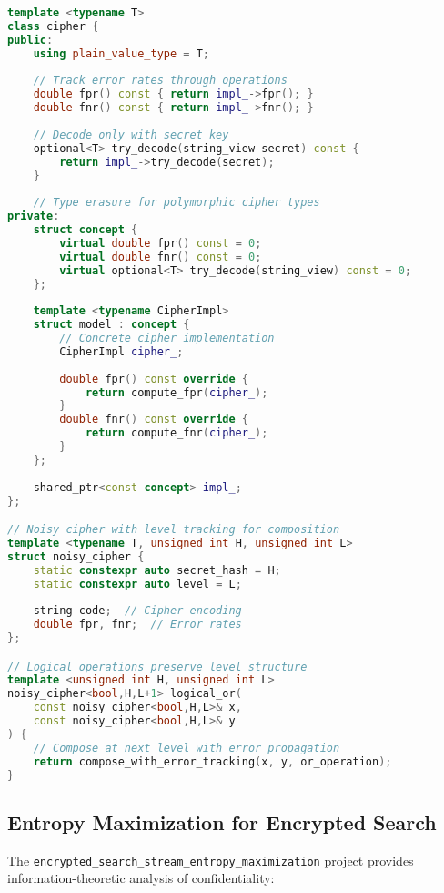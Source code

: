 \begin{lstlisting}[language=C++, caption={Type-erased cipher values with monadic noise}]
template <typename T>
class cipher {
public:
    using plain_value_type = T;
    
    // Track error rates through operations
    double fpr() const { return impl_->fpr(); }
    double fnr() const { return impl_->fnr(); }
    
    // Decode only with secret key
    optional<T> try_decode(string_view secret) const {
        return impl_->try_decode(secret);
    }
    
    // Type erasure for polymorphic cipher types
private:
    struct concept {
        virtual double fpr() const = 0;
        virtual double fnr() const = 0;
        virtual optional<T> try_decode(string_view) const = 0;
    };
    
    template <typename CipherImpl>
    struct model : concept {
        // Concrete cipher implementation
        CipherImpl cipher_;
        
        double fpr() const override { 
            return compute_fpr(cipher_); 
        }
        double fnr() const override { 
            return compute_fnr(cipher_); 
        }
    };
    
    shared_ptr<const concept> impl_;
};

// Noisy cipher with level tracking for composition
template <typename T, unsigned int H, unsigned int L>
struct noisy_cipher {
    static constexpr auto secret_hash = H;
    static constexpr auto level = L;
    
    string code;  // Cipher encoding
    double fpr, fnr;  // Error rates
};

// Logical operations preserve level structure
template <unsigned int H, unsigned int L>
noisy_cipher<bool,H,L+1> logical_or(
    const noisy_cipher<bool,H,L>& x,
    const noisy_cipher<bool,H,L>& y
) {
    // Compose at next level with error propagation
    return compose_with_error_tracking(x, y, or_operation);
}
\end{lstlisting}

\subsection{Entropy Maximization for Encrypted Search}

The \texttt{encrypted\_search\_stream\_entropy\_maximization} project provides information-theoretic analysis of confidentiality:


